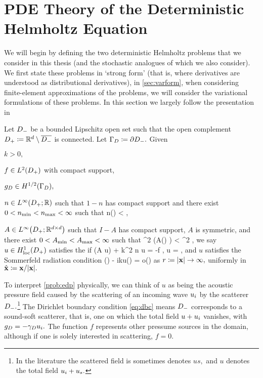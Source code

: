 \section{PDE Theory of the Deterministic Helmholtz Equation}
  

  We will begin by defining the two deterministic Helmholtz problems that we consider in this thesis (and the stochastic analogues of which we also consider). We first state these problems in `strong form' (that is, where derivatives are understood as distributional derivatives), in \cref{sec:varform}, when considering finite-element approximations of the problems, we will consider the variational formulations of these problems. In this section we largely follow the presentation in \cite{GrPeSp:19}

  \label{prob:edp}
  Let $D_{-}$ be a bounded Lipschitz open set such that the open complement $D_{+} \coloneqq \mathbb R^{d} \setminus \overline{D_{-}}$ is connected. Let $\Gamma_{D} \coloneqq \partial D_{-}.$ Given
  \bit
  \item $k > 0,$
\item $f \in \LtDp$ with compact support,
\item $\gD \in \HhGD,$
\item $n \in \LiDpRR$ such that $1-n$ has compact support and there exist $0 < n_{\min} < n_{\max} < \infty$ such that
  \beqs
\nmin \leq n(\bx) < \nmax \tfae \bx \in \Dp,
  \eeqs
\item $A \in \LiDpRRdtd$ such that $I-A$ has compact support, $A$ is symmetric, and there exist $0 < A_{\min} < A_{\max} < \infty$ such that
  \beqs
\Amin \abs{\bxi}^2 \leq \mleft(A(\bx) \bxi \mright) \cdot \bxibar < \Amax \abs{\bxi}^2 \tfa \bxi \in \CCd \tfae \bx \in \Dp,
  \eeqs
  \eit
  we say $u \in \HolocDp$ satisfies the  if
  \beqs
\grad \cdot \mleft(A \grad u\mright) + k^2 n u = -f \tin \Dp,
\eeqs
\beq\label{eq:dbc}
\trGD u = \gD,
\eeq
and $u$ satisfies the Sommerfeld radiation condition
\beq\label{eq:sommerfeld}
\dudr(\bx) - iku(\bx) = o\mleft(\mright)
\eeq
as $r \de \abs{\bx} \rightarrow \infty,$ uniformly in $\bxhat \de \bx/\abs{\bx}.$
\eprob

To interpret \cref{prob:edp} physically, we can think of $u$ as being the acoustic pressure field caused by the scattering of an incoming wave $u_{i}$ by the scatterer $D_{-}.$\footnote{In the literature the scattered field is sometimes denotes $us,$ and $u$ denotes the total field $u_{i}+ u_{s}.$} The Dirichlet boundary condition \eqref{eq:dbc} means $D_{-}$ corresponds to a sound-soft scatterer, that is, one on which the total field $u + u_{i}$ vanishes, with $g_{D} = - \gamma_{D} u_{i}.$ The function $f$ represents other pressume sources in the domain, although if one is solely interested in scattering, $f=0.$

